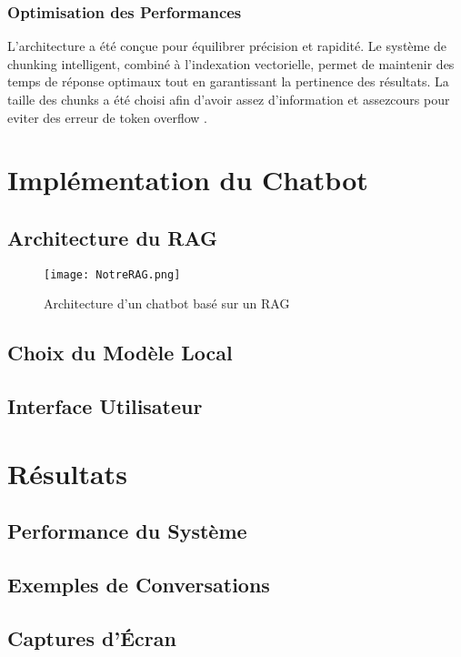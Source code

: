 \documentclass{article}
\begin{document}
\subsubsection{Optimisation des Performances}
L'architecture a été conçue pour équilibrer précision et rapidité. Le système de chunking intelligent, combiné à l'indexation vectorielle, permet de maintenir des temps de réponse optimaux tout en garantissant la pertinence des résultats. La taille des chunks a été choisi afin d'avoir assez d'information et assezcours pour eviter des erreur de token overflow .







\section{Implémentation du Chatbot}
\subsection{Architecture du RAG}
\begin{figure}[ht]
    \centering
    \texttt{[image: NotreRAG.png]}
    \caption{Architecture d’un chatbot basé sur un RAG}
\end{figure}

\subsection{Choix du Modèle Local}


\subsection{Interface Utilisateur}


\section{Résultats}
\subsection{Performance du Système}
\subsection{Exemples de Conversations}
\subsection{Captures d'Écran}
\end{document}
